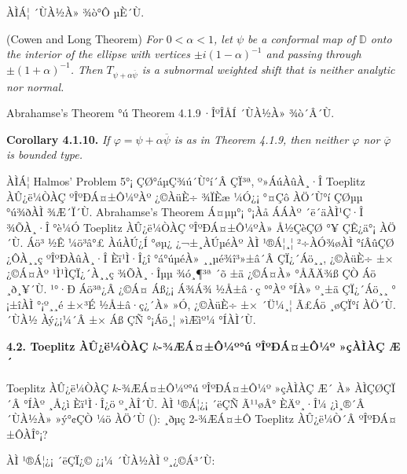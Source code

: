 \documentclass[12pt,a4paper,2sided]{article}
\begin{document}
ÀÌÁ¦ ´ÙÀ½À» ¾ò°Ô µÈ´Ù.

\vspace{.2 cm}{\bf Theorem 4.1.9.} (Cowen and Long Theorem) {\rm
\cite{CoL}} {\sl For $0<\alpha <1$, let $\psi$ be a conformal map of
$\mathbb{D}$ onto the interior of the ellipse with vertices $\pm
i(1-\alpha)^{-1}$ and passing through $\pm (1+\alpha)^{-1}$. Then
$T_{\psi +\alpha\overline{\psi}}$ is a subnormal weighted shift that
is neither analytic nor normal.}
\vspace{.2 cm}

Abrahamse's Theorem °ú Theorem 4.1.9\,·ÎºÎÅÍ ´ÙÀ½À» ¾ò´Â´Ù.

\vspace{.2 cm}

\newpage{}\vspace{0.8cm}

{\bf Corollary 4.1.10.} {\sl If $\varphi=\psi
+\alpha\overline{\psi}$ is as in Theorem 4.1.9, then neither
$\varphi$ nor $\overline{\varphi}$ is bounded type.} \vspace{.2 cm}

ÀÌÁ¦ Halmos' Problem 5°¡ ÇØ°áµÇ¾ú´Ù°í´Â ÇÏ³ª, º»ÁúÀûÀ¸·Î Toeplitz
ÀÛ¿ë¼ÒÀÇ ºÎºÐÁ¤±Ô¼ºÀº ¿©ÀüÈ÷ ¾ÏÈæ ¼Ó¿¡ °¤Çô ÀÖ´Ù°í ÇØµµ °ú¾ðÀÌ
¾Æ´Ï´Ù. Abrahamse's Theorem Á¤µµ°¡ °¡Àå ÁÁÀº ´ë´äÀÌ¹Ç·Î ¾ÕÀ¸·Î °è¼Ó
Toeplitz ÀÛ¿ë¼ÒÀÇ ºÎºÐÁ¤±Ô¼ºÀ» Å½ÇèÇØ °¥ ÇÊ¿ä°¡ ÀÖ´Ù. Áö³­ ½Ê ¼ö³â°£
ÀúÀÚ¿Í °øµ¿ ¿¬±¸ÀÚµéÀº ÀÌ ¹®Á¦¸¦ ²÷ÀÓ¾øÀÌ °íÂûÇØ ¿ÔÀ¸¸ç ºÎºÐÀûÀ¸·Î
Èï¹Ì·Î¿î °á°úµéÀ» ¸¸µé¾î³»±â´Â ÇÏ¿´Áö¸¸, ¿©ÀüÈ÷ ±× ¿©Á¤Àº
¹Ì¹ÌÇÏ¿´À¸¸ç ¾ÕÀ¸·Îµµ ¾ó¸¶³ª ´õ ±ä ¿©Á¤À» °ÅÃÄ¾ß ÇÒ Áö ¸ð¸¥´Ù. ¹°·Ð
Áö³ª¿Â ¿©Á¤ Áß¿¡ Á¾Á¾ ½Å±â·ç °°Àº °ÍÀ» º¸±ä ÇÏ¿´Áö¸¸ °¡±îÀÌ °¡º¸¸é
±×³É ½Å±â·ç¿´À» »Ó, ¿©ÀüÈ÷ ±× ´Ü¼­¸¦ Ã£Áö ¸øÇÏ°í ÀÖ´Ù. ´ÙÀ½ Àý¿¡¼­´Â
±× Áß ÇÑ °¡Áö¸¦ »ìÆìº¼ °ÍÀÌ´Ù.

\vspace{.3 cm} {\bf 4.2. Toeplitz ÀÛ¿ë¼ÒÀÇ $k$-¾ÆÁ¤±Ô¼º°ú ºÎºÐÁ¤±Ô¼º
»çÀÌÀÇ Æ´}

\vspace{.3 cm} Toeplitz ÀÛ¿ë¼ÒÀÇ $k$-¾ÆÁ¤±Ô¼º°ú ºÎºÐÁ¤±Ô¼º »çÀÌÀÇ Æ´
À» ÀÌÇØÇÏ´Â °ÍÀº ¸Å¿ì Èï¹Ì·Î¿ö º¸ÀÎ´Ù. ÀÌ ¹®Á¦¿¡ ´ëÇÑ Ã¹¹øÂ°
ÈÄº¸·Î¼­ ¿ì¸®´Â ´ÙÀ½À» »ý°¢ÇÒ ¼ö ÀÖ´Ù (\cite{CuL1}): ¸ðµç 2-¾ÆÁ¤±Ô
Toeplitz ÀÛ¿ë¼Ò´Â ºÎºÐÁ¤±ÔÀÎ°¡?

\medskip

ÀÌ ¹®Á¦¿¡ ´ëÇÏ¿© \cite{CuL1}¿¡¼­ ´ÙÀ½ÀÌ º¸¿©Á³´Ù:
\end{document}

